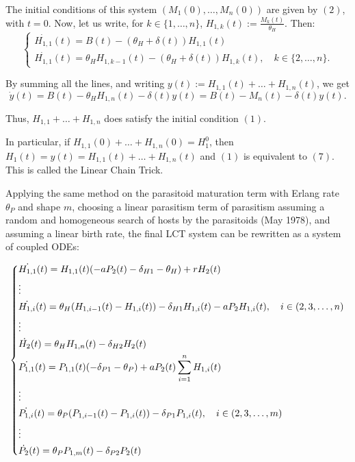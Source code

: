 \documentclass[12pt,a4paper,onecolumn]{article}
\begin{document}
The initial conditions of this system  $(M_1(0), \dots, M_n(0))$ are given by $(2)$, with $t = 0$.
Now, let us write, for \(k \in \{1, \dots, n\}\), $H_{1,k}(t) := \frac{M_k(t)}{\theta_H}$. Then:
\begin{equation}
\begin{cases}
\dot{H_{1,1}}(t) = B(t) - (\theta_H + \delta(t)) H_{1,1}(t) \\
\dot{H_{1,1}}(t) = \theta_H H_{1, k-1}(t) - (\theta_H + \delta(t)) H_{1,k}(t), \quad k \in \{2, \dots, n\}.
\end{cases}
\end{equation}

By summing all the lines, and writing $y(t) := H_{1,1}(t) + \dots + H_{1,n}(t)$, we get 
\[
\dot{y}(t) = B(t) - \theta_H H_{1,n}(t) - \delta(t) y(t) = B(t) - M_n(t) - \delta(t) y(t).
\]

Thus, $H_{1,1} + \dots + H_{1,n}$ does satisfy the initial condition $(1)$.

In particular, if $H_{1,1}(0) + \dots + H_{1,n}(0) =  H_1^0$, then $H_1(t) = y(t) = H_{1,1}(t) + \dots + H_{1,n}(t)$ and $(1)$ is equivalent to $(7)$. This is called the Linear Chain Trick.

Applying the same method on the parasitoid maturation term with Erlang rate $\theta_P$ and shape $m$, choosing a linear parasitism term of parasitism assuming a random and homogeneous search of hosts by the parasitoids (May 1978), and assuming a linear birth rate, the final LCT system can be rewritten as a system of coupled ODEs:

\begin{equation}
\begin{dcases}
\dot{H_{1,1}}(t) = H_{1,1}(t)(-a P_2(t) - \delta_{H1} - \theta_H) + r H_2(t) \\
\vdots \\
\dot{H_{1,i}}(t) = \theta_H(H_{1,i-1}(t) - H_{1,i}(t)) - \delta_{H1} H_{1,i}(t) - aP_2H_{1,i}(t), \quad i \in (2, 3, \dots, n) \\
\vdots \\
\dot{H_{2}}(t) = \theta_H H_{1,n}(t) - \delta_{H2} H_{2}(t) \\
\dot{P_{1,1}}(t) = P_{1,1}(t)(- \delta_{P1} - \theta_P) + a P_2(t) \sum_{i=1}^{n} H_{1,i}(t) \\
\vdots \\
\dot{P_{1,i}}(t) = \theta_P(P_{1,i-1}(t) - P_{1,i}(t)) - \delta_{P1} P_{1,i}(t), \quad i \in (2, 3, \dots, m) \\
\vdots \\
\dot{P_{2}}(t) = \theta_P P_{1,m}(t) - \delta_{P2} P_{2}(t) \\
\end{dcases}
\end{equation}
\end{document}

